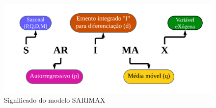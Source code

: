 \begin{figure}[H]
	\centering
	\caption{Significado do modelo SARIMAX}
	\label{fig:sarimaxmap}
	\includegraphics[width=\linewidth]{Modelos/Figuras/sarimax_map}
	
\end{figure}

